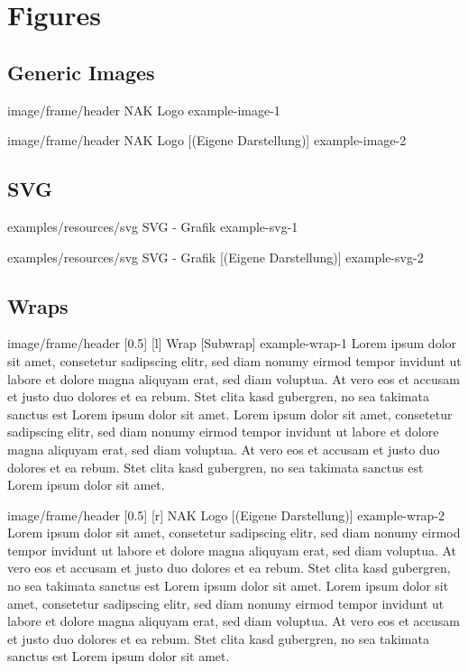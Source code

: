 \chapter{Figures}\label{ch:figures}

\section{Generic Images}\label{sec:figures-generic-images}
\image
{image/frame/header}
{NAK Logo}
{example-image-1}

\image
{image/frame/header}
{NAK Logo}
[(Eigene Darstellung)]
{example-image-2}

\section{SVG}\label{sec:figures-svg}
\svg
{examples/resources/svg}
{SVG - Grafik}
{example-svg-1}

\svg
{examples/resources/svg}
{SVG - Grafik}
[(Eigene Darstellung)]
{example-svg-2}

\section{Wraps}\label{sec:figurs-wrap}
\wrap
{image/frame/header}
[0.5\linewidth]
[l] %
{Wrap}
[Subwrap] %
{example-wrap-1}
Lorem ipsum dolor sit amet, consetetur sadipscing elitr, sed diam nonumy eirmod tempor invidunt ut labore et dolore magna aliquyam erat, sed diam voluptua. At vero eos et accusam et justo duo dolores et ea rebum. Stet clita kasd gubergren, no sea takimata sanctus est Lorem ipsum dolor sit amet. Lorem ipsum dolor sit amet, consetetur sadipscing elitr, sed diam nonumy eirmod tempor invidunt ut labore et dolore magna aliquyam erat, sed diam voluptua. At vero eos et accusam et justo duo dolores et ea rebum. Stet clita kasd gubergren, no sea takimata sanctus est Lorem ipsum dolor sit amet.



\wrap
{image/frame/header}
[0.5\linewidth]
[r] %
{NAK Logo}
[(Eigene Darstellung)]
{example-wrap-2}
Lorem ipsum dolor sit amet, consetetur sadipscing elitr, sed diam nonumy eirmod tempor invidunt ut labore et dolore magna aliquyam erat, sed diam voluptua. At vero eos et accusam et justo duo dolores et ea rebum. Stet clita kasd gubergren, no sea takimata sanctus est Lorem ipsum dolor sit amet. Lorem ipsum dolor sit amet, consetetur sadipscing elitr, sed diam nonumy eirmod tempor invidunt ut labore et dolore magna aliquyam erat, sed diam voluptua. At vero eos et accusam et justo duo dolores et ea rebum. Stet clita kasd gubergren, no sea takimata sanctus est Lorem ipsum dolor sit amet.